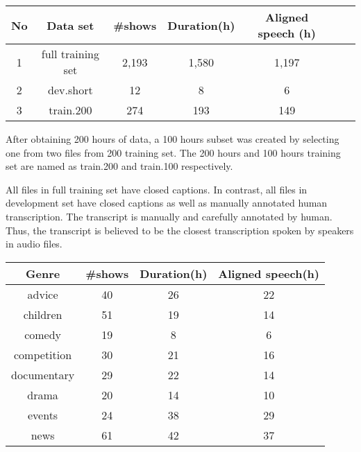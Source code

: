 \begin{center}
\begin{tabular}{ | c | c | c | c | c | c | c | }
\hline
No & Data set & \#shows & Duration(h) & Aligned speech (h) \\ \hline
1 & full training set & 2,193 & 1,580 & 1,197 \\ \hline
2 & dev.short & 12 & 8 & 6 \\ \hline
3 & train.200 & 274 & 193  & 149 \\ \hline
\end{tabular}
\end{center}

 After obtaining 200 hours of data, a 100 hours subset was created by selecting one from two files from 200 training set. The 200 hours and 100 hours training set are named as train.200 and train.100 respectively.


All files in full training set have closed captions. In contrast, all files in development set have closed captions as well as manually annotated human transcription. The transcript is manually and carefully annotated by human. Thus, the transcript is believed to be the closest transcription spoken by speakers in audio files.


\begin{center}
\begin{tabular}{ | c | c | c | c|}
\hline
\textbf{Genre} & \textbf{\#shows}  & \textbf{Duration(h)} & Aligned speech(h) \\ \hline \hline
advice & 40 & 26 & 22 \\ \hline
children & 51 & 19 & 14 \\ \hline
comedy & 19 & 8 & 6 \\ \hline
competition & 30 & 21 & 16 \\ \hline
documentary & 29 & 22 & 14 \\ \hline
drama & 20 & 14 & 10 \\ \hline
events & 24 & 38 & 29 \\ \hline
news & 61 & 42 & 37 \\ \hline
\end{tabular}
\end{center}

